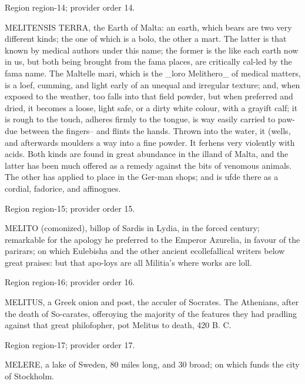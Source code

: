 \documentclass[11pt]{article}
\begin{document}
{\scriptsize\color{gray} Region region-14; provider order 14.\par}
\medskip

MELITENSIS TERRA, the Earth of Malta: an earth, which bears are two very different kinds; the one of which is a bolo, the other a mart. The latter is that known by medical authors under this name; the former is the like each earth now in us, but both being brought from the fama places, are critically cal-led by the fama name. The Maltelle mari, which is the \_loro Melithero\_ of medical matters, is a loef, cumming, and light early of an unequal and irregular texture; and, when exposed to the weather, too falls into that field powder, but when preferred and dried, it becomes a loose, light safe, or a dirty white colour, with a grayift calf; it is rough to the touch, adheres firmly to the tongue, is way easily carried to paw- due between the fingers– and flints the hands. Thrown into the water, it (wells, and afterwards moulders a way into a fine powder. It ferhens very violently with acids. Both kinds are found in great abundance in the illand of Malta, and the latter has been much offered as a remedy against the bits of venomous animals. The other has applied to place in the Ger-man shops; and is ufde there as a cordial, fadorice, and affinogues.
\par

{\scriptsize\color{gray} Region region-15; provider order 15.\par}
\medskip

MELITO (comonized), billop of Sardis in Lydia, in the forced century; remarkable for the apology he preferred to the Emperor Azurelia, in favour of the parirars; on which Eulebisha and the other ancient ecollefallical writers below great praises: but that apo-loys are all Militia’s where works are loll.
\par

{\scriptsize\color{gray} Region region-16; provider order 16.\par}
\medskip

MELITUS, a Greek onion and post, the acculer of Socrates. The Athenians, after the death of So-carates, offeroying the majority of the features they had pradling against that great philofopher, pot Melitus to death, 420 B. C.
\par

{\scriptsize\color{gray} Region region-17; provider order 17.\par}
\medskip

MELERE, a lake of Sweden, 80 miles long, and 30 broad; on which funds the city of Stockholm.
\par
\end{document}
